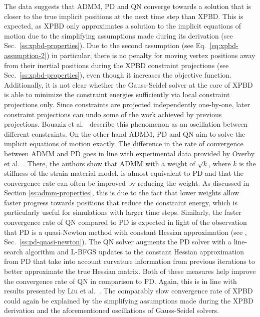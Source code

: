 The data suggests that ADMM, PD and QN converge towards a solution that is closer to the true implicit positions at the next time step than XPBD. This is expected, 
as XPBD only approximates a solution to the implicit equations of motion due to the simplifying assumptions made during its derivation (see Sec.\ \ref{ss:xpbd-properties}).
Due to the second assumption (see Eq.\ \ref{eq:xpbd-assumption-2}) in particular, there is no penalty for moving vertex positions away from their inertial positions during 
the XPBD constraint projections (see Sec.\ \ref{ss:xpbd-properties}), even though it increases the objective function. Additionally,
it is not clear whether the Gauss-Seidel solver at the core of XPBD is able to minimize the constraint energies sufficiently via local constraint projections only.
Since constraints are projected independently one-by-one, later constraint projections can undo some of the work achieved by previous projections. Bouaziz et al.\ 
\cite{bouaziz2014} describe this phenomenon as an oscillation between different constraints. On the other hand ADMM, PD and QN aim to solve the implicit equations 
of motion exactly. The difference in the rate of convergence between ADMM and PD goes in line 
with experimental data provided by Overby et al.\ \cite{overby2017}. There, the authors show that ADMM with a weight of $\sqrt{k}$, where $k$ is the stiffness of the 
strain material model, is almost equivalent to PD and that the convergence rate can often be improved by reducing the weight. As discussed in 
Section \ref{ss:admm-properties}, this is due to the fact that lower weights allow faster progress towards positions that reduce the constraint energy, which is particularly 
useful for simulations with larger time steps. Similarly, the faster convergence rate of QN compared to PD is expected in light of the observation that PD is a quasi-Newton method 
with constant Hessian approximation (see \cite{liu2017}, Sec.\ \ref{ss:pd-quasi-newton}). The QN solver augments the PD solver with a line-search algorithm and L-BFGS updates to 
the constant Hessian approximation from PD that take into account curvature information from previous iterations to better approximate the true Hessian matrix. Both
of these measures help improve the convergence rate of QN in comparison to PD. Again, this is in line with results presented by Liu et al.\ \cite{liu2017}. The comparably
slow convergence rate of XPBD could again be explained by the simplifying assumptions made during the XPBD derivation and the aforementioned oscillations of Gauss-Seidel
solvers. 

